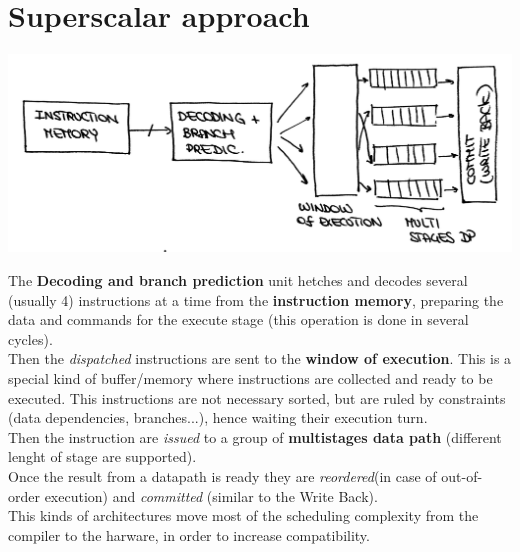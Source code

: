 \section{Superscalar approach}
\begin{center}
  \includegraphics[width=0.7\linewidth]{img/img3/3}
\end{center}
The \textbf{Decoding and branch prediction} unit hetches and decodes several
(usually 4) instructions at a time from the \textbf{instruction memory},
preparing the data and commands for the execute stage (this operation is done
in several cycles).\\ Then the \textit{dispatched} instructions are sent to the
\textbf{window of execution}.  This is a special kind of buffer/memory where
instructions are collected and ready to be executed. This instructions are not
necessary sorted, but are ruled by constraints (data dependencies,
branches...), hence waiting their execution turn.\\ Then the instruction are
\textit{issued} to a group of \textbf{multistages data path} (different lenght
of stage are supported).\\ Once the result from a datapath is ready they are
\textit{reordered}(in case of out-of-order execution) and \textit{committed}
(similar to the Write Back).\\
This kinds of architectures move most of the scheduling complexity from the
compiler to the harware, in order to increase compatibility.



